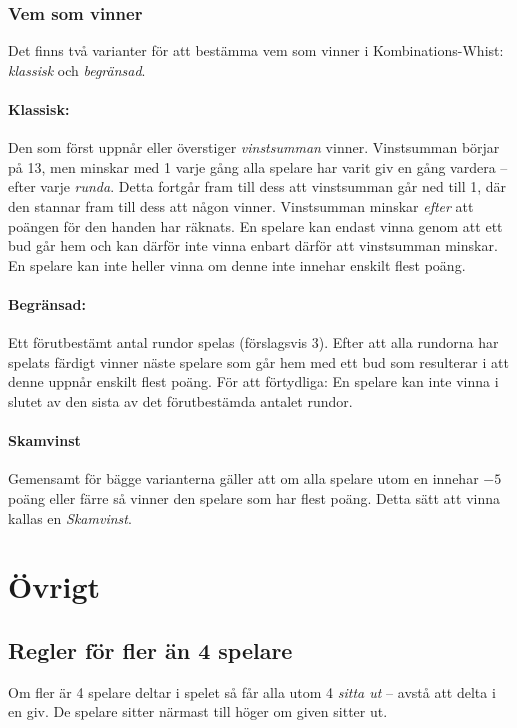 \documentclass[a4paper]{article} %
\begin{document}
	\subsubsection{Vem som vinner}
	\label{sec:winning}
	Det finns två varianter för att bestämma vem som vinner i Kombinations-Whist: \emph{klassisk} och \emph{begränsad}.

	\paragraph{Klassisk:}
	Den som först uppnår eller överstiger \emph{vinstsumman} vinner. Vinstsumman börjar på 13, men minskar med 1 varje gång alla spelare har varit giv en gång vardera -- efter varje \emph{runda}. Detta fortgår fram till dess att vinstsumman går ned till 1, där den stannar fram till dess att någon vinner. Vinstsumman minskar \emph{efter} att poängen för den handen har räknats. En spelare kan endast vinna genom att ett bud går hem och kan därför inte vinna enbart därför att vinstsumman minskar. En spelare kan inte heller vinna om denne inte innehar enskilt flest poäng.

	\paragraph{Begränsad:}
	Ett förutbestämt antal rundor spelas (förslagsvis 3). Efter att alla rundorna har spelats färdigt vinner näste spelare som går hem med ett bud som resulterar i att denne uppnår enskilt flest poäng. För att förtydliga: En spelare kan inte vinna i slutet av den sista av det förutbestämda antalet rundor.

	\paragraph{Skamvinst} Gemensamt för bägge varianterna gäller att om alla spelare utom en innehar $-5$ poäng eller färre så vinner den spelare som har flest poäng. Detta sätt att vinna kallas en \emph{Skamvinst}.

	\section{Övrigt}
	\subsection{Regler för fler än 4 spelare}
	Om fler är 4 spelare deltar i spelet så får alla utom 4 \emph{sitta ut} -- avstå att delta i en giv. De spelare sitter närmast till höger om given sitter ut.
		
\end{document}
